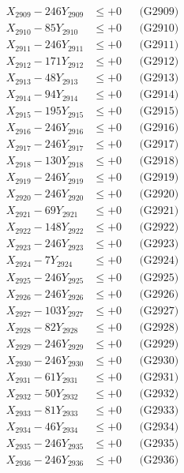 \documentclass[a4paper,10pt]{article}
\begin{document}
{\begin{align}
X_{2909} - 246Y_{2909} &\leq +0 && \text{(G2909)} \\
X_{2910} - 85Y_{2910} &\leq +0 && \text{(G2910)} \\
\allowbreak
X_{2911} - 246Y_{2911} &\leq +0 && \text{(G2911)} \\
X_{2912} - 171Y_{2912} &\leq +0 && \text{(G2912)} \\
X_{2913} - 48Y_{2913} &\leq +0 && \text{(G2913)} \\
X_{2914} - 94Y_{2914} &\leq +0 && \text{(G2914)} \\
X_{2915} - 195Y_{2915} &\leq +0 && \text{(G2915)} \\
X_{2916} - 246Y_{2916} &\leq +0 && \text{(G2916)} \\
X_{2917} - 246Y_{2917} &\leq +0 && \text{(G2917)} \\
X_{2918} - 130Y_{2918} &\leq +0 && \text{(G2918)} \\
X_{2919} - 246Y_{2919} &\leq +0 && \text{(G2919)} \\
X_{2920} - 246Y_{2920} &\leq +0 && \text{(G2920)} \\
\allowbreak
X_{2921} - 69Y_{2921} &\leq +0 && \text{(G2921)} \\
X_{2922} - 148Y_{2922} &\leq +0 && \text{(G2922)} \\
X_{2923} - 246Y_{2923} &\leq +0 && \text{(G2923)} \\
X_{2924} - 7Y_{2924} &\leq +0 && \text{(G2924)} \\
X_{2925} - 246Y_{2925} &\leq +0 && \text{(G2925)} \\
X_{2926} - 246Y_{2926} &\leq +0 && \text{(G2926)} \\
X_{2927} - 103Y_{2927} &\leq +0 && \text{(G2927)} \\
X_{2928} - 82Y_{2928} &\leq +0 && \text{(G2928)} \\
X_{2929} - 246Y_{2929} &\leq +0 && \text{(G2929)} \\
X_{2930} - 246Y_{2930} &\leq +0 && \text{(G2930)} \\
\allowbreak
X_{2931} - 61Y_{2931} &\leq +0 && \text{(G2931)} \\
X_{2932} - 50Y_{2932} &\leq +0 && \text{(G2932)} \\
X_{2933} - 81Y_{2933} &\leq +0 && \text{(G2933)} \\
X_{2934} - 46Y_{2934} &\leq +0 && \text{(G2934)} \\
X_{2935} - 246Y_{2935} &\leq +0 && \text{(G2935)} \\
X_{2936} - 246Y_{2936} &\leq +0 && \text{(G2936)} \\

\end{align}}
\end{document}
